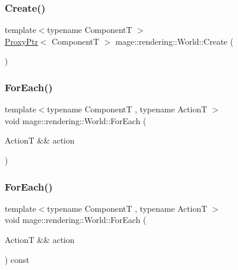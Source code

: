 \subsubsection{\texorpdfstring{Create()}{Create()}}
{\footnotesize\ttfamily template$<$typename ComponentT $>$ \\
\mbox{\hyperlink{classmage_1_1_proxy_ptr}{Proxy\+Ptr}}$<$ ComponentT $>$ mage\+::rendering\+::\+World\+::\+Create (\begin{DoxyParamCaption}{ }\end{DoxyParamCaption})}

\mbox{\label{classmage_1_1rendering_1_1_world_a8ec9ac4bef64ec20111cd7cfddd4e379}} 
\subsubsection{\texorpdfstring{For\+Each()}{ForEach()}\hspace{0.1cm}{\footnotesize\ttfamily [1/2]}}
{\footnotesize\ttfamily template$<$typename ComponentT , typename ActionT $>$ \\
void mage\+::rendering\+::\+World\+::\+For\+Each (\begin{DoxyParamCaption}\item[{ActionT \&\&}]{action }\end{DoxyParamCaption})}

\mbox{\label{classmage_1_1rendering_1_1_world_a0461e3f09a19e4f6a64f77d04ac1b672}} 
\subsubsection{\texorpdfstring{For\+Each()}{ForEach()}\hspace{0.1cm}{\footnotesize\ttfamily [2/2]}}
{\footnotesize\ttfamily template$<$typename ComponentT , typename ActionT $>$ \\
void mage\+::rendering\+::\+World\+::\+For\+Each (\begin{DoxyParamCaption}\item[{ActionT \&\&}]{action }\end{DoxyParamCaption}) const}

